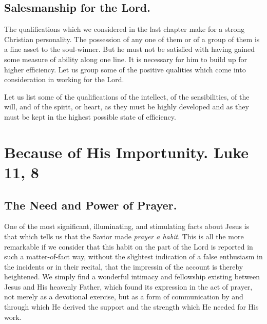 \documentclass[
]{book}
\begin{document}
\hypertarget{salesmanship-for-the-lord.}{%
\section*{Salesmanship for the Lord.}\label{salesmanship-for-the-lord.}}

The qualifications which we considered in the last chapter make for a strong Christian personality. The possession of any one of them or of a group of them is a fine asset to the soul-winner. But he must not be satisfied with having gained some measure of ability along one line. It is necessary for him to build up for higher efficiency. Let us group some of the positive qualities which come into consideration in working for the Lord.

Let us list some of the qualifications of the intellect, of the sensibilities, of the will, and of the spirit, or heart, as they must be highly developed and as they must be kept in the highest possible state of efficiency.

\hypertarget{because-of-his-importunity.-luke-11-8}{%
\chapter{Because of His Importunity. Luke 11, 8}\label{because-of-his-importunity.-luke-11-8}}

\hypertarget{the-need-and-power-of-prayer.}{%
\section*{The Need and Power of Prayer.}\label{the-need-and-power-of-prayer.}}

One of the most significant, illuminating, and stimulating facts about Jesus is that which tells us that the Savior made \emph{prayer a habit}. This is all the more remarkable if we consider that this habit on the part of the Lord is reported in such a matter-of-fact way, without the slightest indication of a false enthusiasm in the incidents or in their recital, that the impressin of the account is thereby heightened. We simply find a wonderful intimacy and fellowship existing between Jesus and His heavenly Father, which found its expression in the act of prayer, not merely as a devotional exercise, but as a form of communication by and through which He derived the support and the strength which He needed for His work.
\end{document}
